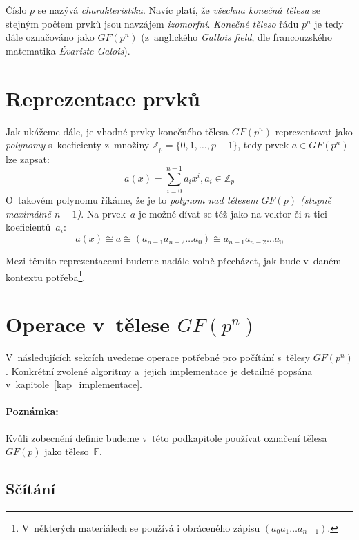 \documentclass[thesis=M,czech,hidelinks]{FITthesis}[2012/06/26]
\newcommand{\0}{{\textcolor[gray]{0.75}{0}}}
\begin{document}
Číslo $p$ se nazývá \emph{charakteristika}. Navíc platí, že \emph{všechna
konečná tělesa} se stejným počtem prvků jsou navzájem \emph{izomorfní}.
\emph{Konečné těleso} řádu $p^n$ je tedy dále označováno jako $GF(p^n)$
(z~anglického \emph{Gallois field}, dle francouzského matematika \emph{Évariste
Galois}).



\section{Reprezentace prvků}

Jak ukážeme dále, je vhodné prvky konečného tělesa $GF(p^n)$ reprezentovat jako
\emph{polynomy} s~koeficienty z~množiny $\mathbb{Z}_p=\{0,1,\ldots,p-1\}$, tedy
prvek $a \in GF(p^n)$ lze zapsat:
$$
    a(x) = \sum_{i=0}^{n-1} a_i x^i, a_i \in \mathbb{Z}_p
$$
O~takovém polynomu říkáme, že je to \emph{polynom nad tělesem $GF(p)$ (stupně
maximálně $n-1$)}. Na prvek~$a$ je možné dívat se též jako na vektor či $n$-tici
koeficientů~$a_i$:
$$
    a(x) \cong a \cong (a_{n-1} a_{n-2} \ldots a_0) \cong
    a_{n-1} a_{n-2} \ldots a_0
$$

Mezi těmito reprezentacemi budeme nadále volně přecházet, jak bude v~daném
kontextu potřeba\footnote{
    V~některých materiálech se používá i obráceného zápisu
    $(a_0 a_1 \ldots a_{n-1})$.
}.



\section{Operace v~tělese $GF(p^n)$}

V~následujících sekcích uvedeme operace potřebné pro počítání s~tělesy
$GF(p^n)$. Konkrétní zvolené algoritmy a~jejich implementace je detailně popsána
v~kapitole~\ref{kap_implementace}.


\paragraph{Poznámka:} Kvůli zobecnění definic budeme v~této podkapitole používat
označení tělesa $GF(p)$ jako těleso~$\mathbb{F}$.


\subsection{Sčítání}
\end{document}
